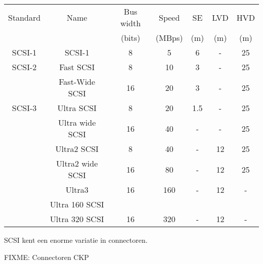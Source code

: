 \begin{center}
\begin{tabular}{ |c|c|c|c|c|c|c| } 
 \hline
 Standard & Name & Bus width & Speed & SE & LVD & HVD \\
  & &(bits) & (MBps) & (m) & (m) & (m) \\
 \hline\hline
 SCSI-1 & SCSI-1 & 8 & 5 & 6 & - & 25 \\
 \hline
 SCSI-2 & Fast SCSI & 8 & 10 & 3 & - & 25 \\
 \hline
        & Fast-Wide SCSI & 16 & 20 & 3 & - & 25 \\
 \hline
 SCSI-3 & Ultra SCSI & 8 & 20 & 1.5 & - & 25 \\
 \hline
        & Ultra wide SCSI & 16 & 40 & - & - & 25 \\
 \hline
        & Ultra2 SCSI & 8 & 40 & - & 12 & 25 \\
 \hline
        & Ultra2 wide SCSI & 16 & 80 & - & 12 & 25 \\
 \hline
        & Ultra3 & 16 & 160 & - & 12 & - \\
        & Ultra 160 SCSI &  &  &  &  &  \\
 \hline
        & Ultra 320 SCSI & 16 & 320 & - & 12 & - \\
 \hline
\end{tabular}
\end{center}

SCSI kent een enorme variatie in connectoren.

FIXME: Connectoren CKP
